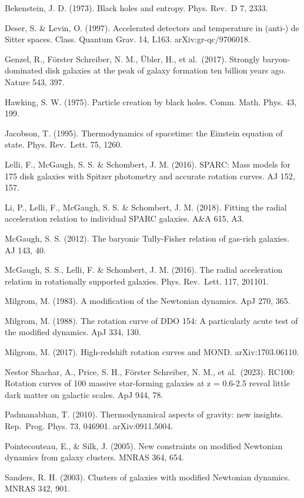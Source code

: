 \documentclass[11pt]{article}
\begin{document}
Bekenstein, J. D. (1973). Black holes and entropy. Phys. Rev.~D 7, 2333.

Deser, S. \& Levin, O. (1997). Accelerated detectors and temperature in (anti-) de Sitter spaces. Class. Quantum Grav. 14, L163. arXiv:gr-qc/9706018.

Genzel, R., Förster Schreiber, N. M., Übler, H., et al.~(2017). Strongly baryon-dominated disk galaxies at the peak of galaxy formation ten billion years ago. Nature 543, 397.

Hawking, S. W. (1975). Particle creation by black holes. Comm. Math. Phys. 43, 199.

Jacobson, T. (1995). Thermodynamics of spacetime: the Einstein equation of state. Phys. Rev.~Lett. 75, 1260.

Lelli, F., McGaugh, S. S. \& Schombert, J. M. (2016). SPARC: Mass models for 175 disk galaxies with Spitzer photometry and accurate rotation curves. AJ 152, 157.

Li, P., Lelli, F., McGaugh, S. S. \& Schombert, J. M. (2018). Fitting the radial acceleration relation to individual SPARC galaxies. A\&A 615, A3.

McGaugh, S. S. (2012). The baryonic Tully-Fisher relation of gas-rich galaxies. AJ 143, 40.

McGaugh, S. S., Lelli, F. \& Schombert, J. M. (2016). The radial acceleration relation in rotationally supported galaxies. Phys. Rev.~Lett. 117, 201101.

Milgrom, M. (1983). A modification of the Newtonian dynamics. ApJ 270, 365.

Milgrom, M. (1988). The rotation curve of DDO 154: A particularly acute test of the modified dynamics. ApJ 334, 130.

Milgrom, M. (2017). High-redshift rotation curves and MOND. arXiv:1703.06110.

Nestor Shachar, A., Price, S. H., Förster Schreiber, N. M., et al.~(2023). RC100: Rotation curves of 100 massive star-forming galaxies at z = 0.6-2.5 reveal little dark matter on galactic scales. ApJ 944, 78.

Padmanabhan, T. (2010). Thermodynamical aspects of gravity: new insights. Rep.~Prog. Phys. 73, 046901. arXiv:0911.5004.

Pointecouteau, E., \& Silk, J. (2005). New constraints on modified Newtonian dynamics from galaxy clusters. MNRAS 364, 654.

Sanders, R. H. (2003). Clusters of galaxies with modified Newtonian dynamics. MNRAS 342, 901.
\end{document}
